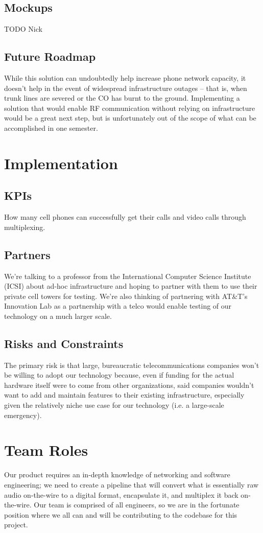 \documentclass[10pt]{article}
\begin{document}
\subsection*{Mockups}
TODO Nick

\subsection*{Future Roadmap}
While this solution can undoubtedly help increase phone network capacity, it
doesn't help in the event of widespread infrastructure outages -- that is, when
trunk lines are severed or the CO has burnt to the ground.  Implementing
a solution that would enable RF communication without relying on infrastructure
would be a great next step, but is unfortunately out of the scope of what can be
accomplished in one semester.

\section{Implementation}
\subsection*{KPIs}
How many cell phones can successfully get their calls and video calls through
multiplexing.

\subsection*{Partners}
We're talking to a professor from the International Computer Science Institute
(ICSI) about ad-hoc infrastructure and hoping to partner with them to use their
private cell towers for testing. We're also thinking of partnering with AT\&T's
Innovation Lab as a partnership with a telco would enable testing of our
technology on a much larger scale.

\subsection*{Risks and Constraints}
The primary risk is that large, bureaucratic telecommunications companies won't
be willing to adopt our technology because, even if funding for the actual
hardware itself were to come from other organizations, said companies wouldn't
want to add and maintain features to their existing infrastructure, especially
given the relatively niche use case for our technology (i.e. a large-scale
emergency).

\section{Team Roles}
Our product requires an in-depth knowledge of networking and
software engineering; we need to create a pipeline that will convert what is
essentially raw audio on-the-wire to a digital format, encapsulate it, and
multiplex it back on-the-wire.  Our team is comprised of all engineers, so we
are in the fortunate position where we all can and will be contributing to the
codebase for this project.
\end{document}
